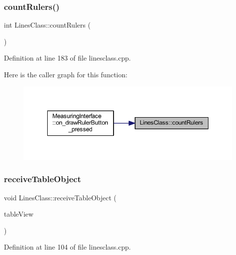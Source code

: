 \subsubsection{\texorpdfstring{countRulers()}{countRulers()}}
{\footnotesize\ttfamily int Lines\+Class\+::count\+Rulers (\begin{DoxyParamCaption}{ }\end{DoxyParamCaption})}



Definition at line 183 of file linesclass.\+cpp.

Here is the caller graph for this function\+:
\nopagebreak
\begin{figure}[H]
\begin{center}
\leavevmode
\includegraphics[width=348pt]{classLinesClass_a1b656266d53d9364c9969514efd2c878_icgraph}
\end{center}
\end{figure}
\mbox{\label{classLinesClass_a7cbdbb9847cc00cbc64141572c536866}} 
\subsubsection{\texorpdfstring{receiveTableObject}{receiveTableObject}}
{\footnotesize\ttfamily void Lines\+Class\+::receive\+Table\+Object (\begin{DoxyParamCaption}\item[{Q\+Table\+View \&}]{table\+View }\end{DoxyParamCaption})\hspace{0.3cm}{\ttfamily [slot]}}



Definition at line 104 of file linesclass.\+cpp.

